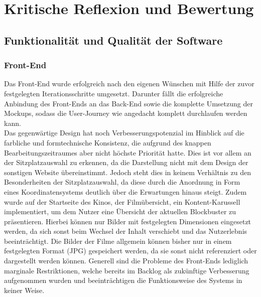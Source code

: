 \section{Kritische Reflexion und Bewertung}
\multipleauthorsection{\authorRF}{\authorEJ}

\subsection{Funktionalität und Qualität der Software}

\subsubsection*{Front-End}
Das Front-End wurde erfolgreich nach den eigenen Wünschen mit Hilfe der zuvor festgelegten Iterationsschritte umgesetzt.
Darunter fällt die erfolgreiche Anbindung des Front-Ends an das Back-End sowie die komplette Umsetzung der Mockups, sodass die User-Journey wie angedacht komplett durchlaufen werden kann.\\
Das gegenwärtige Design hat noch Verbesserungspotenzial im Hinblick auf die farbliche und formtechnische Konsistenz, die aufgrund des knappen Bearbeitungszeitraumes aber nicht höchste Priorität hatte.
Dies ist vor allem an der Sitzplatzauswahl zu erkennen, da die Darstellung nicht mit dem Design der sonstigen Website übereinstimmt.
Jedoch steht dies in keinem Verhältnis zu den Besonderheiten der Sitzplatzauswahl, da diese durch die Anordnung in Form eines Koordinatensystems deutlich über die Erwartungen hinaus steigt.
Zudem wurde auf der Startseite des Kinos, der Filmübersicht, ein Kontent-Karussell implementiert, um dem Nutzer eine Übersicht der aktuellen Blockbuster zu präsentieren.
Hierbei können nur Bilder mit festgelegten Dimensionen eingesetzt werden, da sich sonst beim Wechsel der Inhalt verschiebt und das Nutzerlebnis beeinträchtigt.
Die Bilder der Filme allgemein können bisher nur in einem festgelegten Format (JPG) gespeichert werden, da sie sonst nicht referenziert oder dargestellt werden können.
Generell sind die Probleme des Front-Ends lediglich marginale Restriktionen, welche bereits im Backlog als zukünftige Verbesserung aufgenommen wurden und beeinträchtigen die Funktionsweise des Systems in keiner Weise.


